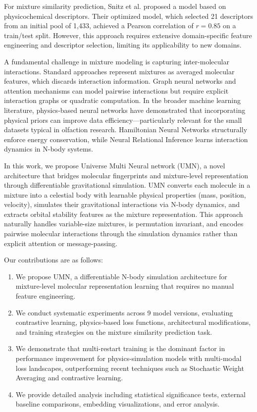 \documentclass[11pt,a4paper]{article}
\begin{document}
For mixture similarity prediction, Snitz et al. \cite{snitz2013} proposed a model based on physicochemical descriptors. Their optimized model, which selected 21 descriptors from an initial pool of 1,433, achieved a Pearson correlation of $r = 0.85$ on a train/test split. However, this approach requires extensive domain-specific feature engineering and descriptor selection, limiting its applicability to new domains.

A fundamental challenge in mixture modeling is capturing inter-molecular interactions. Standard approaches represent mixtures as averaged molecular features, which discards interaction information. Graph neural networks \cite{gilmer2017} and attention mechanisms can model pairwise interactions but require explicit interaction graphs or quadratic computation. In the broader machine learning literature, physics-based neural networks have demonstrated that incorporating physical priors can improve data efficiency---particularly relevant for the small datasets typical in olfaction research. Hamiltonian Neural Networks \cite{greydanus2019} structurally enforce energy conservation, while Neural Relational Inference \cite{kipf2018} learns interaction dynamics in N-body systems.

In this work, we propose Universe Multi Neural network (UMN), a novel architecture that bridges molecular fingerprints and mixture-level representation through differentiable gravitational simulation. UMN converts each molecule in a mixture into a celestial body with learnable physical properties (mass, position, velocity), simulates their gravitational interactions via N-body dynamics, and extracts orbital stability features as the mixture representation. This approach naturally handles variable-size mixtures, is permutation invariant, and encodes pairwise molecular interactions through the simulation dynamics rather than explicit attention or message-passing.

Our contributions are as follows:
\begin{enumerate}[label=(\alph*)]
    \item We propose UMN, a differentiable N-body simulation architecture for mixture-level molecular representation learning that requires no manual feature engineering.
    \item We conduct systematic experiments across 9 model versions, evaluating contrastive learning, physics-based loss functions, architectural modifications, and training strategies on the mixture similarity prediction task.
    \item We demonstrate that multi-restart training is the dominant factor in performance improvement for physics-simulation models with multi-modal loss landscapes, outperforming recent techniques such as Stochastic Weight Averaging and contrastive learning.
    \item We provide detailed analysis including statistical significance tests, external baseline comparisons, embedding visualizations, and error analysis.
\end{enumerate}
\end{document}
